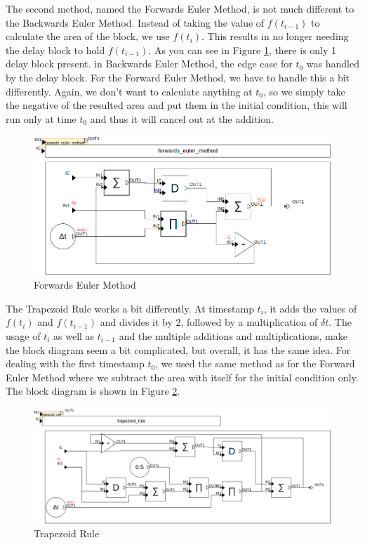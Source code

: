 \documentclass{article}
\begin{document}
The second method, named the Forwards Euler Method, is not much different to the Backwards Euler Method. Instead of taking the value of $f(t_{i-1})$ to calculate the area of the block, we use $f(t_{i})$. This results in no longer needing the delay block to hold $f(t_{i-1})$. As you can see in Figure \ref{fig:forwards_euler}, there is only 1 delay block present. in Backwards Euler Method, the edge case for $t_{0}$ was handled by the delay block. For the Forward Euler Method, we have to handle this a bit differently. Again, we don't want to calculate anything at $t_{0}$, so we simply take the negative of the resulted area and put them in the initial condition, this will run only at time $t_{0}$ and thus it will cancel out at the addition.\\

\begin{figure}
    \centering
    \includegraphics[width=0.75\linewidth]{Images/Forward_Euler_Method.drawio.png}
    \caption{Forwards Euler Method}
    \label{fig:forwards_euler}
\end{figure}

The Trapezoid Rule works a bit differently. At timestamp $t_{i}$, it adds the values of $f(t_{i})$ and $f(t_{i-1})$ and divides it by 2, followed by a multiplication of $\delta t$. The usage of $t_{i}$ as well as $t_{i-1}$ and the multiple additions and multiplications, make the block diagram seem a bit complicated, but overall, it has the same idea. For dealing with the first timestamp $t_{0}$, we used the same method as for the Forward Euler Method where we subtract the area with itself for the initial condition only. The block diagram is shown in Figure \ref{fig:trapezoid_rule}.\\

\begin{figure}
    \centering
    \includegraphics[width=0.75\linewidth]{Images/Trapezoid_Rule.drawio.png}
    \caption{Trapezoid Rule}
    \label{fig:trapezoid_rule}
\end{figure}
\end{document}

